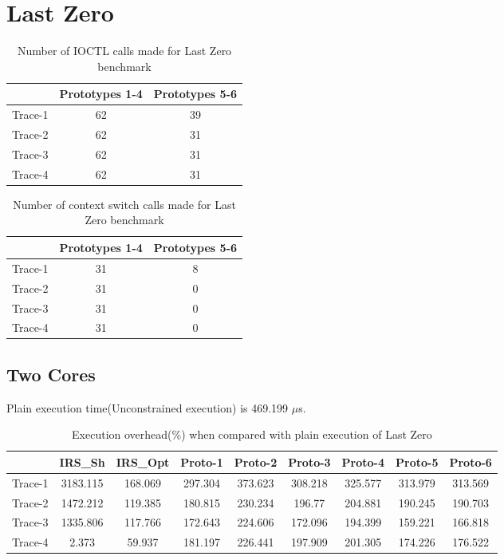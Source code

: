 \section{Last Zero}

\begin{table}[h]
\begin{center}
 \begin{tabular}{|c c c|} 
 \hline
 & Prototypes 1-4 & Prototypes 5-6\\ %
 \hline
Trace-1 & 62 & 39\\
Trace-2 & 62 & 31\\
Trace-3 & 62 & 31\\
Trace-4 & 62 & 31\\
\hline
\end{tabular}
\end{center}
\caption{Number of IOCTL calls made for Last Zero benchmark}
\label{last_zero_num_syncs}

\end{table}

\begin{table}[h]
\begin{center}
 \begin{tabular}{|c c c|} 
 \hline
 & Prototypes 1-4 & Prototypes 5-6\\ %
 \hline
Trace-1 & 31 & 8\\
Trace-2 & 31 & 0\\
Trace-3 & 31 & 0\\
Trace-4 & 31 & 0\\
\hline
\end{tabular}
\end{center}
\caption{Number of context switch calls made for Last Zero benchmark}
\label{last_zero_num_ctxt}
\end{table}

\subsection{Two Cores}
Plain execution time(Unconstrained execution) is 469.199 $\mu$s.
\begin{table}[h]
\begin{center}
 \begin{tabular}{|c c c c c c c c c|} 
 \hline
 & IRS\_Sh & IRS\_Opt& Proto-1 & Proto-2 & Proto-3 & Proto-4 & Proto-5 & Proto-6\\ %
 \hline
Trace-1 & 3183.115 & 168.069 & 297.304 & 373.623 & 308.218 & 325.577 & 313.979 & 313.569\\
Trace-2 & 1472.212 & 119.385 & 180.815 & 230.234 & 196.77 & 204.881 & 190.245 & 190.703\\
Trace-3 & 1335.806 & 117.766 & 172.643 & 224.606 & 172.096 & 194.399 & 159.221 & 166.818\\
Trace-4 & 2.373 & 59.937 & 181.197 & 226.441 & 197.909 & 201.305 & 174.226 & 176.522\\
\hline
\end{tabular}
\end{center}
\caption{Execution overhead(\%) when compared with plain execution of Last Zero}
\label{last_zero_irs_res_cores_2}
\end{table}
\newpage
